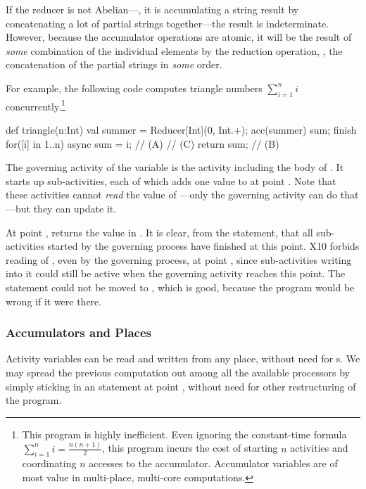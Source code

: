 If the reducer is not Abelian---\eg, it is accumulating a string result by
concatenating a lot of partial strings together---the result is indeterminate.
However, because the accumulator operations are atomic, it will be the result
of {\em some} combination of the individual elements by the reduction
operation, \eg, the concatenation of the partial strings in {\em some} order.  



For example, the following code computes triangle numbers {$\sum_{i=1}^{n}i$}
concurrently.\footnote{This program is highly inefficient. Even ignoring the
  constant-time formula {$\sum_{i=1}^{n}i = \frac{n(n+1)}{2}$}, this program
  incurs the cost of starting {$n$} activities and coordinating {$n$} accesses
  to the accumulator. Accumulator variables are of most value in multi-place,
  multi-core computations.}


%
\begin{xten}
def triangle(n:Int) {
  val summer = Reducer[Int](0, Int.+);
  acc(summer) sum; 
  finish {
    for([i] in 1..n) async {
      sum = i;  // (A)
    }
    // (C)
  }
  return sum; // (B)
}
\end{xten}

The governing activity of the  variable  is the activity
including the body of .  It starts up  sub-activities,
each of which adds one value to  at point .  Note that these
activities cannot {\em read} the value of ---only the governing
activity can do that---but they can update it.  

At point ,  returns the value in . It is
clear, from the  statement, that all sub-activities started by the
governing process have finished at this point. X10 forbids reading of
, even by the governing process, at point , since
sub-activities writing into it could still be active when the governing
activity reaches this point.  The  statement could not be
moved to , which is good, because the program would be wrong if it
were there.




\subsubsection{Accumulators and Places}
 Activity variables can be read and written from
any place, without need for s. We may spread the previous
computation out among all the available processors by simply sticking in an
 statement at point , without need for other
restructuring of the program.

